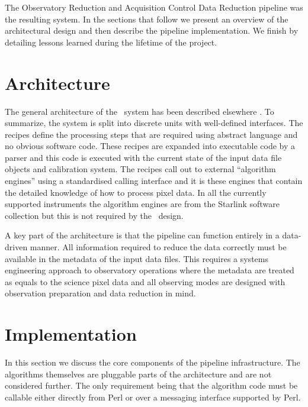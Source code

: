 \documentclass[final,authoryear,5p,times,twocolumn]{elsarticle}
\begin{document}
The Observatory Reduction and Acquisition Control Data Reduction pipeline
\citep[\oracdr;][]{1999ASPC..172...11E,2008AN....329..295C} was
the resulting system. In the sections that follow we present an
overview of the architectural design and then describe the pipeline
implementation. We finish by detailing lessons learned during the
lifetime of the project.

\section{Architecture}

The general architecture of the \oracdr\ system has been described
elsewhere \citep{1999ASPC..172...11E,2008AN....329..295C}. To
summarize, the system is split into discrete units with well-defined
interfaces. The recipes define the processing steps that are required
using abstract language and no obvious software code. These recipes
are expanded into executable code by a parser and this code is
executed with the current state of the input data file objects and
calibration system. The recipes call out to external ``algorithm
engines'' using a standardised calling interface and it is these
engines that contain the detailed knowledge of how to process pixel
data.  In all the currently supported instruments the algorithm
engines are from the Starlink software collection
\citep[][]{2014ASPC..485..391C} but this is not
required by the \oracdr\ design.

A key part of the architecture is that the pipeline can function
entirely in a data-driven manner. All information required to reduce
the data correctly must be available in the metadata of the input data
files. This requires a systems engineering approach to observatory
operations where the metadata are treated as equals to the science
pixel data \citep[see e.g.,][for an overview of the JCMT and UKIRT
approach]{2011tfa..confE..42J} and all observing modes are designed
with observation preparation and data reduction in mind.

\section{Implementation}

In this section we discuss the core components of the pipeline
infrastructure. The algorithms themselves are pluggable parts of the
architecture and are not considered further. The only requirement
being that the algorithm code must be callable either directly from
Perl or over a messaging interface supported by Perl.
\end{document}
